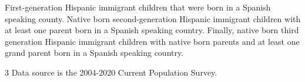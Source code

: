\begin{table}[!h]
{\begin{threeparttable}
\begin{tablenotes}
{                      First-generation Hispanic immigrant children that were born in a 
                      Spanish speaking county. Native born second-generation Hispanic 
                      immigrant children with at least one parent born in a Spanish speaking 
                      country. Finally, native born third generation Hispanic immigrant children 
                      with native born parents and at least one grand parent born in a Spanish 
                      speaking country.}
\item[3] \footnotesize{Data source is the 2004-2020 Current Population Survey.}
\end{tablenotes}
\end{threeparttable}}
\end{table}
